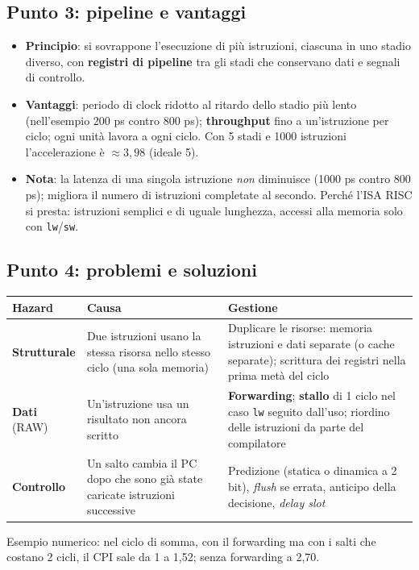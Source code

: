 \subsection*{Punto 3: pipeline e vantaggi}
\begin{itemize}
    \item \textbf{Principio}: si sovrappone l'esecuzione di più istruzioni, ciascuna in uno stadio diverso, con \textbf{registri di pipeline} tra gli stadi che conservano dati e segnali di controllo.
    \item \textbf{Vantaggi}: periodo di clock ridotto al ritardo dello stadio più lento (nell'esempio 200 ps contro 800 ps); \textbf{throughput} fino a un'istruzione per ciclo; ogni unità lavora a ogni ciclo. Con 5 stadi e 1000 istruzioni l'accelerazione è $\approx 3{,}98$ (ideale 5).
    \item \textbf{Nota}: la latenza di una singola istruzione \emph{non} diminuisce (1000 ps contro 800 ps); migliora il numero di istruzioni completate al secondo. Perché l'ISA RISC si presta: istruzioni semplici e di uguale lunghezza, accessi alla memoria solo con \texttt{lw}/\texttt{sw}.
\end{itemize}

\subsection*{Punto 4: problemi e soluzioni}
\begin{center}
\small
\begin{tabularx}{\textwidth}{@{}>{\raggedright\arraybackslash}p{2.6cm}XX@{}}
\toprule
\textbf{Hazard} & \textbf{Causa} & \textbf{Gestione} \\
\midrule
\textbf{Strutturale} & Due istruzioni usano la stessa risorsa nello stesso ciclo (una sola memoria) & Duplicare le risorse: memoria istruzioni e dati separate (o cache separate); scrittura dei registri nella prima metà del ciclo \\
\textbf{Dati} (RAW) & Un'istruzione usa un risultato non ancora scritto & \textbf{Forwarding}; \textbf{stallo} di 1 ciclo nel caso \texttt{lw} seguito dall'uso; riordino delle istruzioni da parte del compilatore \\
\textbf{Controllo} & Un salto cambia il PC dopo che sono già state caricate istruzioni successive & Predizione (statica o dinamica a 2 bit), \emph{flush} se errata, anticipo della decisione, \emph{delay slot} \\
\bottomrule
\end{tabularx}
\end{center}
Esempio numerico: nel ciclo di somma, con il forwarding ma con i salti che costano 2 cicli, il CPI sale da 1 a 1{,}52; senza forwarding a 2{,}70.

